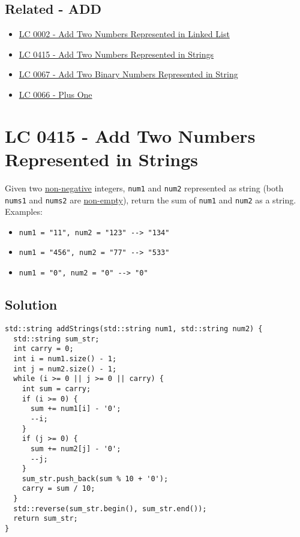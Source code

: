 \subsection*{Related - ADD}
\begin{itemize}
\item \hyperref[lc0002]{LC 0002 - Add Two Numbers Represented in Linked List}
\item \hyperref[lc0415]{LC 0415 - Add Two Numbers Represented in Strings}
\item \hyperref[lc0067]{LC 0067 - Add Two Binary Numbers Represented in String}
\item \hyperref[lc0066]{LC 0066 - Plus One}
\end{itemize}

\section{LC 0415 - Add Two Numbers Represented in Strings}\label{lc0415}
Given two \ul{non-negative} integers, {\colorbox{CodeBackground}{\lstinline|num1|}} and {\colorbox{CodeBackground}{\lstinline|num2|}} represented as string (both {\colorbox{CodeBackground}{\lstinline|nums1|}} and {\colorbox{CodeBackground}{\lstinline|nums2|}} are \ul{non-empty}), return the sum of {\colorbox{CodeBackground}{\lstinline|num1|}} and {\colorbox{CodeBackground}{\lstinline|num2|}} as a string.\\

Examples:
\begin{itemize}
\item {\colorbox{CodeBackground}{\lstinline|num1 = "11", num2 = "123" --> "134"|}}
\item {\colorbox{CodeBackground}{\lstinline|num1 = "456", num2 = "77" --> "533"|}}
\item {\colorbox{CodeBackground}{\lstinline|num1 = "0", num2 = "0" --> "0"|}}
\end{itemize}

\subsection*{Solution}
\begin{lstlisting}
std::string addStrings(std::string num1, std::string num2) {
  std::string sum_str;
  int carry = 0;
  int i = num1.size() - 1;
  int j = num2.size() - 1;
  while (i >= 0 || j >= 0 || carry) {
    int sum = carry;
    if (i >= 0) {
      sum += num1[i] - '0';
      --i;
    }
    if (j >= 0) {
      sum += num2[j] - '0';
      --j;
    }
    sum_str.push_back(sum % 10 + '0');
    carry = sum / 10;
  }
  std::reverse(sum_str.begin(), sum_str.end());
  return sum_str;
}
\end{lstlisting}

